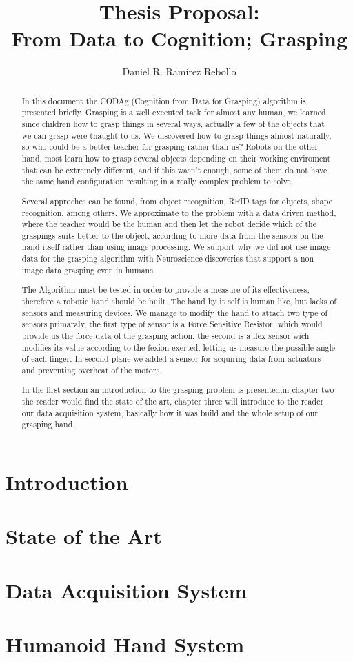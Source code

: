\documentclass[a4paper,10pt]{report}
\title{Thesis Proposal: \\ From Data to Cognition; Grasping}
\author{Daniel R. Ramírez Rebollo}
\begin{document}
\maketitle

\begin{abstract}
In this document the CODAg (Cognition from Data for Grasping) algorithm is presented briefly. Grasping is a well executed task
for almost any human, we learned since children how to grasp things in several ways, actually a few of the objects that we 
can grasp were thaught to us. We discovered how to grasp things almost naturally, so who could be a better teacher for 
grasping rather than us?
Robots on the other hand, most learn how to grasp several objects depending on their working enviroment that can be
extremely different, and if this wasn't enough, some of them do not have the same hand configuration resulting in a really 
complex problem to solve.

Several approches can be found, from object recognition, RFID tags for objects, shape recognition, among others. We approximate
to the problem with a data driven method, where the teacher would be the human and then let the robot decide which of the graspings
suits better to the object, according to more data from the sensors on the hand itself rather than using image processing. We
support why we did not use image data for the grasping algorithm with Neuroscience discoveries that support a non image data
grasping even in humans.

The Algorithm must be tested in order to provide a measure of its effectiveness, therefore a robotic hand should be built. The
hand by it self is human like, but lacks of sensors and measuring devices. We manage to modify the hand to attach two type of
sensors primaraly, the first type of sensor is a Force Sensitive Resistor, which would provide us the force data of the grasping 
action, the second is a flex sensor wich modifies its value according to the fexion exerted, letting us measure the possible 
angle of each finger. In second plane we added a sensor for acquiring data from actuators and preventing overheat of the motors.

In the first section an introduction to the grasping problem is presented,in chapter two the reader would find the state of 
the art, chapter three will introduce to the reader our data acquisition system, basically how it was build and the whole setup of our grasping 
hand.

\end{abstract}

\chapter{Introduction}

\chapter{State of the Art}

\chapter{Data Acquisition System}

\chapter{Humanoid Hand System}
\end{document}
